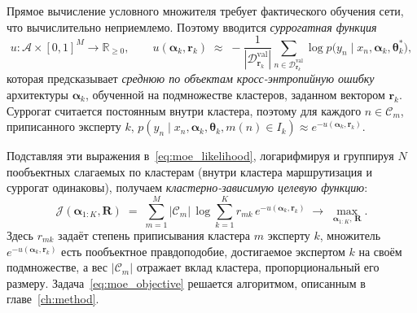 Прямое вычисление условного множителя требует фактического обучения
сети, что вычислительно неприемлемо. Поэтому вводится
\emph{суррогатная функция}
\begin{equation}
\label{eq:surrogate_def}
u: \mathcal{A} \times [0,1]^M \to \mathbb{R}_{\geq 0},
\qquad u(\boldsymbol{\alpha}_k, \mathbf{r}_k)
\;\approx\;
- \frac{1}{|\mathcal{D}_{\mathbf{r}_k}^{\text{val}}|}
\sum_{n \in \mathcal{D}_{\mathbf{r}_k}^{\text{val}}}
\log p\bigl(y_n \mid x_n, \boldsymbol{\alpha}_k, \boldsymbol{\theta}_k^{*}\bigr),
\end{equation}
которая предсказывает \emph{среднюю по объектам кросс-энтропийную
ошибку} архитектуры $\boldsymbol{\alpha}_k$, обученной на подмножестве
кластеров, заданном вектором $\mathbf{r}_k$. Суррогат считается
постоянным внутри кластера, поэтому для каждого $n \in \mathcal{C}_m$,
приписанного эксперту $k$,
$p(y_n \mid x_n, \boldsymbol{\alpha}_k, \boldsymbol{\theta}_k, m(n) \in I_k) \approx e^{-u(\boldsymbol{\alpha}_k, \mathbf{r}_k)}$.

Подставляя эти выражения в~\eqref{eq:moe_likelihood}, логарифмируя и
группируя $N$ пообъектных слагаемых по кластерам (внутри кластера
маршрутизация и суррогат одинаковы), получаем
\emph{кластерно-зависимую целевую функцию}:
\begin{equation}
\label{eq:moe_objective}
\mathcal{J}(\boldsymbol{\alpha}_{1:K}, \mathbf{R}) \;=\;
\sum_{m=1}^{M} |\mathcal{C}_m|\,\log \sum_{k=1}^{K} r_{mk}\, e^{-u(\boldsymbol{\alpha}_k, \mathbf{r}_k)}
\;\to\; \max_{\boldsymbol{\alpha}_{1:K},\, \mathbf{R}}.
\end{equation}
Здесь $r_{mk}$ задаёт степень приписывания кластера $m$ эксперту $k$,
множитель $e^{-u(\boldsymbol{\alpha}_k, \mathbf{r}_k)}$ есть пообъектное
правдоподобие, достигаемое экспертом $k$ на своём подмножестве, а вес
$|\mathcal{C}_m|$ отражает вклад кластера, пропорциональный его размеру.
Задача~\eqref{eq:moe_objective} решается алгоритмом, описанным в
главе~\ref{ch:method}.
